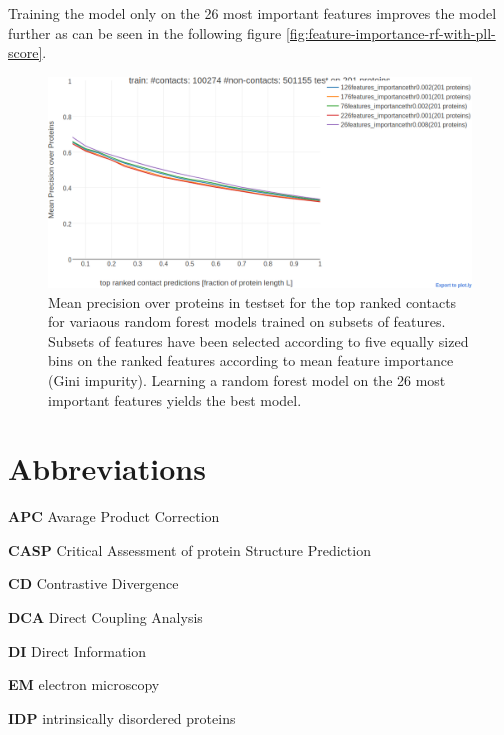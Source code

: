 \documentclass[12pt,a4paper,twoside]{book}
\theoremstyle{definition}
\theoremstyle{definition}
\theoremstyle{remark}
\begin{document}
Training the model only on the 26 most important features improves the
model further as can be seen in the following figure
\ref{fig:feature-importance-rf-with-pll-score}.









\begin{figure}
\includegraphics[width=0.9\linewidth]{img/random_forest_contact_prior/precision_vs_rank_featureselectionrandom_forest_nestimators1000_classweightNone_criterionentropy_maxdepth100_minsamplesleaf100_26features} \caption{Mean precision over
proteins in testset for the top ranked contacts for variaous random
forest models trained on subsets of features. Subsets of features have
been selected according to five equally sized bins on the ranked
features according to mean feature importance (Gini impurity). Learning
a random forest model on the 26 most important features yields the best
model.}\label{fig:feature-selection-rf-with-pll-score}
\end{figure}

\appendix


\hypertarget{abbrev}{\chapter{Abbreviations}\label{abbrev}}

\textbf{APC} Avarage Product Correction

\textbf{CASP} Critical Assessment of protein Structure Prediction

\textbf{CD} Contrastive Divergence

\textbf{DCA} Direct Coupling Analysis

\textbf{DI} Direct Information

\textbf{EM} electron microscopy

\textbf{IDP} intrinsically disordered proteins
\end{document}
